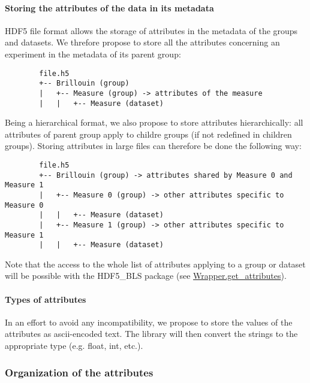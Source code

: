 \paragraph{Storing the attributes of the data in its metadata}

    HDF5 file format allows the storage of attributes in the metadata of the groups and datasets. We threfore propose to store all the attributes concerning an experiment in the metadata of its parent group:
    \begin{verbatim}
        file.h5
        +-- Brillouin (group)
        |   +-- Measure (group) -> attributes of the measure
        |   |   +-- Measure (dataset) 
    \end{verbatim}

    Being a hierarchical format, we also propose to store attributes hierarchically: all attributes of parent group apply to childre groups (if not redefined in children groups). Storing attributes in large files can therefore be done the following way:
    \begin{verbatim}
        file.h5
        +-- Brillouin (group) -> attributes shared by Measure 0 and Measure 1
        |   +-- Measure 0 (group) -> other attributes specific to Measure 0
        |   |   +-- Measure (dataset)
        |   +-- Measure 1 (group) -> other attributes specific to Measure 1
        |   |   +-- Measure (dataset)
    \end{verbatim}

    Note that the access to the whole list of attributes applying to a group or dataset will be possible with the HDF5\_BLS package (see \hyperref[subsec:wrapper.get_attributes]{Wrapper.get\_attributes}).

\paragraph{Types of attributes}

    In an effort to avoid any incompatibility, we propose to store the values of the attributes as ascii-encoded text. The library will then convert the strings to the appropriate type (e.g. float, int, etc.).

\subsubsection*{Organization of the attributes}

